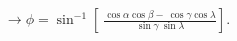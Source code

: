 \documentclass[preview]{standalone}
\begin{document}
\begin{align*}
\rightarrow \phi = \sin^{-1} \left[\
                            \frac{ \cos\alpha \cos\beta -\
                            \cos\gamma \cos\lambda }{ \sin\gamma \
                            \sin\lambda } \right].
\end{align*}
\end{document}
